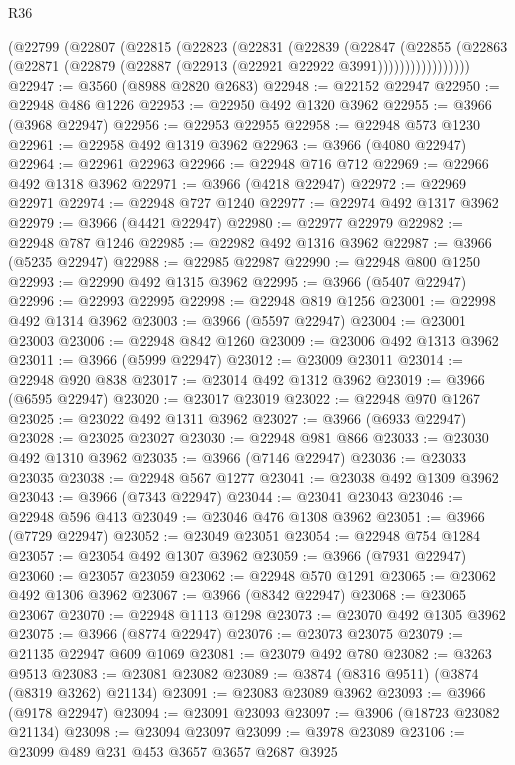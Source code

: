 \begin{lexlean}{R36}
\begin{coremodule}
          (@22799
            (@22807
              (@22815
                (@22823
                  (@22831
                    (@22839
                      (@22847
                        (@22855
                          (@22863
                            (@22871 (@22879 (@22887 (@22913 (@22921 @22922 @3991)))))))))))))))))
@22947 := @3560 (@8988 @2820 @2683)
@22948 := @22152 @22947
@22950 := @22948 @486 @1226
@22953 := @22950 @492 @1320 @3962
@22955 := @3966 (@3968 @22947)
@22956 := @22953 @22955
@22958 := @22948 @573 @1230
@22961 := @22958 @492 @1319 @3962
@22963 := @3966 (@4080 @22947)
@22964 := @22961 @22963
@22966 := @22948 @716 @712
@22969 := @22966 @492 @1318 @3962
@22971 := @3966 (@4218 @22947)
@22972 := @22969 @22971
@22974 := @22948 @727 @1240
@22977 := @22974 @492 @1317 @3962
@22979 := @3966 (@4421 @22947)
@22980 := @22977 @22979
@22982 := @22948 @787 @1246
@22985 := @22982 @492 @1316 @3962
@22987 := @3966 (@5235 @22947)
@22988 := @22985 @22987
@22990 := @22948 @800 @1250
@22993 := @22990 @492 @1315 @3962
@22995 := @3966 (@5407 @22947)
@22996 := @22993 @22995
@22998 := @22948 @819 @1256
@23001 := @22998 @492 @1314 @3962
@23003 := @3966 (@5597 @22947)
@23004 := @23001 @23003
@23006 := @22948 @842 @1260
@23009 := @23006 @492 @1313 @3962
@23011 := @3966 (@5999 @22947)
@23012 := @23009 @23011
@23014 := @22948 @920 @838
@23017 := @23014 @492 @1312 @3962
@23019 := @3966 (@6595 @22947)
@23020 := @23017 @23019
@23022 := @22948 @970 @1267
@23025 := @23022 @492 @1311 @3962
@23027 := @3966 (@6933 @22947)
@23028 := @23025 @23027
@23030 := @22948 @981 @866
@23033 := @23030 @492 @1310 @3962
@23035 := @3966 (@7146 @22947)
@23036 := @23033 @23035
@23038 := @22948 @567 @1277
@23041 := @23038 @492 @1309 @3962
@23043 := @3966 (@7343 @22947)
@23044 := @23041 @23043
@23046 := @22948 @596 @413
@23049 := @23046 @476 @1308 @3962
@23051 := @3966 (@7729 @22947)
@23052 := @23049 @23051
@23054 := @22948 @754 @1284
@23057 := @23054 @492 @1307 @3962
@23059 := @3966 (@7931 @22947)
@23060 := @23057 @23059
@23062 := @22948 @570 @1291
@23065 := @23062 @492 @1306 @3962
@23067 := @3966 (@8342 @22947)
@23068 := @23065 @23067
@23070 := @22948 @1113 @1298
@23073 := @23070 @492 @1305 @3962
@23075 := @3966 (@8774 @22947)
@23076 := @23073 @23075
@23079 := @21135 @22947 @609 @1069
@23081 := @23079 @492 @780
@23082 := @3263 @9513
@23083 := @23081 @23082
@23089 := @3874 (@8316 @9511) (@3874 (@8319 @3262) @21134)
@23091 := @23083 @23089 @3962
@23093 := @3966 (@9178 @22947)
@23094 := @23091 @23093
@23097 := @3906 (@18723 @23082 @21134)
@23098 := @23094 @23097
@23099 := @3978 @23089
@23106 := @23099 @489 @231 @453 @3657 @3657 @2687 @3925

\end{coremodule}
\end{lexlean}
